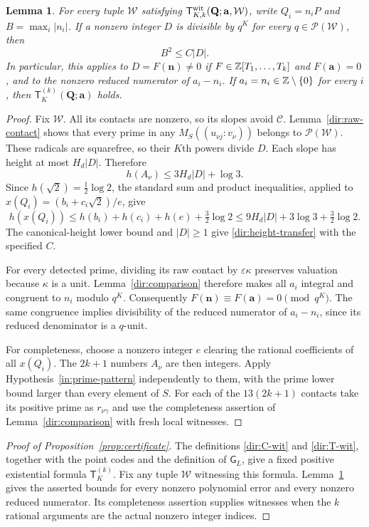 \documentclass[11pt]{article}
\newtheorem{lemma}[theorem]{Lemma}
\theoremstyle{definition}\newtheorem{inputthm}[theorem]{Hypothesis}
\theoremstyle{remark}\newtheorem{remark}[theorem]{Remark}
\newcommand{\C}{\mathcal C}\newcommand{\Supp}{\operatorname{Supp}}
\begin{document}
\begin{lemma}\label{dir:height-certificate}
For every tuple $\mathcal W$ satisfying
$\mathsf T_{K,k}^{\rm wit}(\mathbf Q;\mathbf a,\mathcal W)$, write
$Q_i=n_iP$ and $B=\max_i|n_i|$. If a nonzero integer $D$ is
divisible by $q^K$ for every $q\in\mathcal P(\mathcal W)$, then
\begin{equation}\label{dir:height-transfer}
                         B^2\le C|D|.
\end{equation}
In particular, this applies to $D=F(\mathbf n)\ne0$ if
$F\in\mathbb Z[T_1,\ldots,T_k]$ and $F(\mathbf a)=0$, and to the
nonzero reduced numerator of $a_i-n_i$.
If $a_i=n_i\in\mathbb Z\setminus\{0\}$ for every $i$, then
$\mathsf T_K^{(k)}(\mathbf Q;\mathbf a)$ holds.
\end{lemma}
\begin{proof}
Fix $\mathcal W$. All its contacts are nonzero, so its slopes
avoid $\C$. Lemma~\ref{dir:raw-contact} shows that every prime
in any $M_{S}((u_{\nu j}:v_\nu))$ belongs to
$\mathcal P(\mathcal W)$. These radicals are squarefree, so
their $K$th powers divide $D$. Each slope has height at most
$H_d|D|$. Therefore
\[
 h(A_\nu)\le3H_d|D|+\log3.
\]
Since $h(\sqrt2)=\tfrac12\log2$, the standard sum and product
inequalities, applied to $x(Q_i)=(b_i+c_i\sqrt2)/e$, give
\[
 h(x(Q_i))\le h(b_i)+h(c_i)+h(e)+\tfrac32\log2
 \le9H_d|D|+3\log3+\tfrac32\log2.
\]
The canonical-height lower bound and $|D|\ge1$ give
\eqref{dir:height-transfer} with the specified $C$.

For every detected prime, dividing its raw contact by
$\varepsilon\kappa$ preserves valuation because $\kappa$ is a
unit. Lemma~\ref{dir:comparison} therefore makes all $a_i$
integral and congruent to $n_i$ modulo $q^K$.
Consequently $F(\mathbf n)\equiv F(\mathbf a)=0\pmod{q^K}$.
The same congruence implies divisibility of the reduced numerator
of $a_i-n_i$, since its reduced denominator is a $q$-unit.

For completeness, choose a nonzero integer $e$ clearing the
rational coefficients of all $x(Q_i)$. The $2k+1$ numbers $A_\nu$ are
then integers. Apply Hypothesis~\ref{in:prime-pattern} independently to them,
with the prime lower bound larger than every element of $S$.
For each of the $13(2k+1)$ contacts take its positive prime as
$r_{\nu\gamma}$ and use the completeness assertion of
Lemma~\ref{dir:comparison} with fresh local witnesses.
\end{proof}

\begin{proof}[Proof of Proposition~\ref{prop:certificate}]
The definitions \eqref{dir:C-wit} and \eqref{dir:T-wit}, together with
the point codes and the definition of $\mathsf G_L$, give a
fixed positive existential formula $\mathsf T_K^{(k)}$. Fix any tuple
$\mathcal W$ witnessing this formula. Lemma~\ref{dir:height-certificate}
gives the asserted bounds for every nonzero polynomial error and every
nonzero reduced numerator. Its completeness assertion supplies witnesses
when the $k$ rational arguments are the actual nonzero integer indices.
\end{proof}
\end{document}

